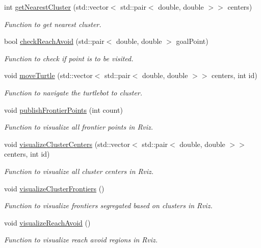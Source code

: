 \begin{DoxyCompactItemize}
int \hyperlink{classFrontierExplorer_acdb43fe4d75b89328499eaab690ef576}{get\+Nearest\+Cluster} (std\+::vector$<$ std\+::pair$<$ double, double $>$$>$ centers)
\begin{DoxyCompactList}\small\item\em Function to get nearest cluster. \end{DoxyCompactList}\item 
bool \hyperlink{classFrontierExplorer_a645d0985b5e21046af0864c6933b27cb}{check\+Reach\+Avoid} (std\+::pair$<$ double, double $>$ goal\+Point)
\begin{DoxyCompactList}\small\item\em Function to check if point is to be visited. \end{DoxyCompactList}\item 
void \hyperlink{classFrontierExplorer_a0c2bdfdf926178c67a521b30b98c798a}{move\+Turtle} (std\+::vector$<$ std\+::pair$<$ double, double $>$$>$ centers, int id)
\begin{DoxyCompactList}\small\item\em Function to navigate the turtlebot to cluster. \end{DoxyCompactList}\item 
void \hyperlink{classFrontierExplorer_a8a7b32fda86f272b5bb10b72485d6a20}{publish\+Frontier\+Points} (int count)
\begin{DoxyCompactList}\small\item\em Function to visualize all frontier points in Rviz. \end{DoxyCompactList}\item 
void \hyperlink{classFrontierExplorer_a4b4a64865166c3641d20496a0cab9b83}{visualize\+Cluster\+Centers} (std\+::vector$<$ std\+::pair$<$ double, double $>$$>$ centers, int id)
\begin{DoxyCompactList}\small\item\em Function to visualize all cluster centers in Rviz. \end{DoxyCompactList}\item 
void \hyperlink{classFrontierExplorer_aedf341ee2e9b63ee6e9adc7a7d8e3c44}{visualize\+Cluster\+Frontiers} ()
\begin{DoxyCompactList}\small\item\em Function to visualize frontiers segregated based on clusters in Rviz. \end{DoxyCompactList}\item 
void \hyperlink{classFrontierExplorer_a2a7e35e8b561d2d79c7ce3747b1ee07a}{visualize\+Reach\+Avoid} ()
\begin{DoxyCompactList}\small\item\em Function to visualize reach avoid regions in Rviz. \end{DoxyCompactList}\end{DoxyCompactItemize}


